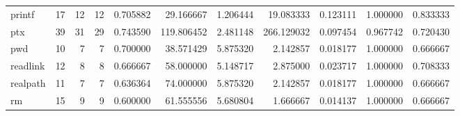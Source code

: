 \begin{tabular}{lrrrrrrrrrr}
printf    &                                      17 &                 12 &                                12 &                                   0.705882 &                              29.166667 &                                     1.206444 &                         19.083333 &                                0.123111 &                           1.000000 &                                           0.833333 \\
ptx       &                                      39 &                 31 &                                29 &                                   0.743590 &                             119.806452 &                                     2.481148 &                        266.129032 &                                0.097454 &                           0.967742 &                                           0.720430 \\
pwd       &                                      10 &                  7 &                                 7 &                                   0.700000 &                              38.571429 &                                     5.875320 &                          2.142857 &                                0.018177 &                           1.000000 &                                           0.666667 \\
readlink  &                                      12 &                  8 &                                 8 &                                   0.666667 &                              58.000000 &                                     5.148717 &                          2.875000 &                                0.023717 &                           1.000000 &                                           0.708333 \\
realpath  &                                      11 &                  7 &                                 7 &                                   0.636364 &                              74.000000 &                                     5.875320 &                          2.142857 &                                0.018177 &                           1.000000 &                                           0.666667 \\
rm        &                                      15 &                  9 &                                 9 &                                   0.600000 &                              61.555556 &                                     5.680804 &                          1.666667 &                                0.014137 &                           1.000000 &                                           0.666667 \\

\end{tabular}
